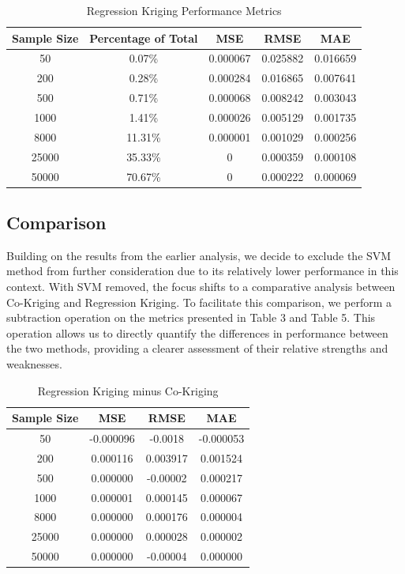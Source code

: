 \documentclass{swmcmthesis}
\begin{document}
\begin{table}[h!]
\centering
\caption{Regression Kriging Performance Metrics}
\label{tab:metrics}
\begin{tabular}{|c|c|c|c|c|}
\hline
\textbf{Sample Size} & \textbf{Percentage of Total} & \textbf{MSE} & \textbf{RMSE} & \textbf{MAE} \\ \hline
50     & 0.07\%  & 0.000067 & 0.025882 & 0.016659 \\ \hline
200    & 0.28\%  & 0.000284 & 0.016865 & 0.007641 \\ \hline
500    & 0.71\%  & 0.000068 & 0.008242 & 0.003043 \\ \hline
1000   & 1.41\%  & 0.000026 & 0.005129 & 0.001735 \\ \hline
8000   & 11.31\% & 0.000001 & 0.001029 & 0.000256 \\ \hline
25000  & 35.33\% & 0 & 0.000359 & 0.000108 \\ \hline
50000  & 70.67\% & 0 & 0.000222 & 0.000069 \\ \hline
\end{tabular}
\end{table}


\subsection{Comparison}

Building on the results from the earlier analysis, we decide to exclude the SVM method from further consideration due to its relatively lower performance in this context. With SVM removed, the focus shifts to a comparative analysis between Co-Kriging and Regression Kriging. To facilitate this comparison, we perform a subtraction operation on the metrics presented in Table 3 and Table 5. This operation allows us to directly quantify the differences in performance between the two methods, providing a clearer assessment of their relative strengths and weaknesses.

\begin{table}[h!]
\centering
\caption{Regression Kriging minus Co-Kriging}
\begin{tabular}{|c|c|c|c|}
\hline
\textbf{Sample Size} & \textbf{MSE} & \textbf{RMSE} & \textbf{MAE} \\\hline
50     & -0.000096 & -0.0018 & -0.000053 \\\hline
200    &0.000116 & 0.003917 & 0.001524 \\\hline
500    &0.000000 & -0.00002 & 0.000217 \\\hline
1000   &0.000001 & 0.000145 & 0.000067 \\\hline
8000   &0.000000 & 0.000176 & 0.000004 \\\hline
25000  &0.000000 & 0.000028 & 0.000002 \\\hline
50000  &0.000000 & -0.00004 & 0.000000 \\\hline
\end{tabular}
\end{table}
\end{document}
